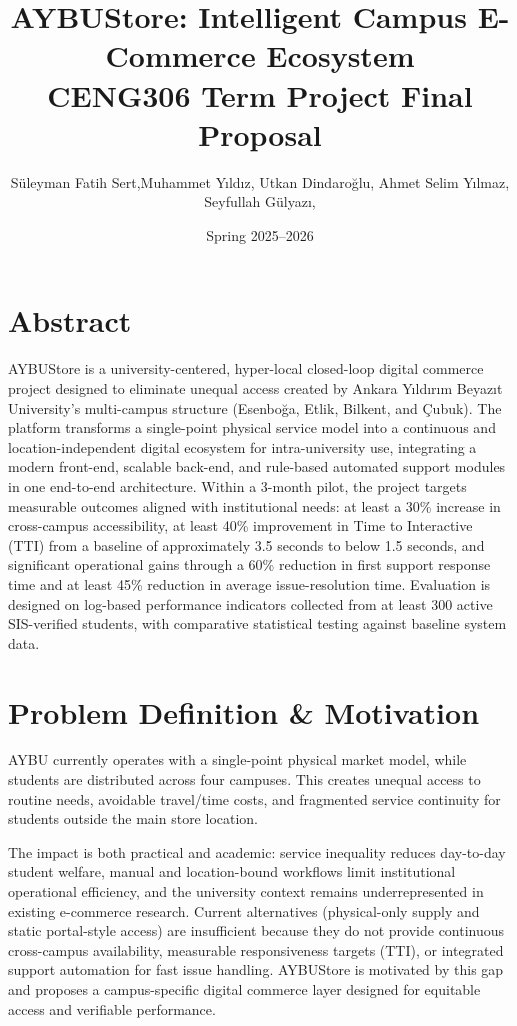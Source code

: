 \documentclass[11pt,a4paper]{article}
\title{\LARGE \textbf{AYBUStore: Intelligent Campus E-Commerce Ecosystem}\\[0.5em] \large \textbf{CENG306 Term Project Final Proposal}}
\author{Süleyman Fatih Sert,Muhammet Yıldız, Utkan Dindaroğlu, Ahmet Selim Yılmaz, \\ Seyfullah Gülyazı, }
\date{Spring 2025--2026}
\begin{document}
\maketitle

\section{Abstract}
AYBUStore is a university-centered, hyper-local closed-loop digital commerce project designed to eliminate unequal access created by Ankara Yıldırım Beyazıt University's multi-campus structure (Esenboğa, Etlik, Bilkent, and Çubuk). The platform transforms a single-point physical service model into a continuous and location-independent digital ecosystem for intra-university use, integrating a modern front-end, scalable back-end, and rule-based automated support modules in one end-to-end architecture. Within a 3-month pilot, the project targets measurable outcomes aligned with institutional needs: at least a 30\% increase in cross-campus accessibility, at least 40\% improvement in Time to Interactive (TTI) from a baseline of approximately 3.5 seconds to below 1.5 seconds, and significant operational gains through a 60\% reduction in first support response time and at least 45\% reduction in average issue-resolution time. Evaluation is designed on log-based performance indicators collected from at least 300 active SIS-verified students, with comparative statistical testing against baseline system data.

\section{Problem Definition \& Motivation}
AYBU currently operates with a single-point physical market model, while students are distributed across four campuses. This creates unequal access to routine needs, avoidable travel/time costs, and fragmented service continuity for students outside the main store location.

The impact is both practical and academic: service inequality reduces day-to-day student welfare, manual and location-bound workflows limit institutional operational efficiency, and the university context remains underrepresented in existing e-commerce research. Current alternatives (physical-only supply and static portal-style access) are insufficient because they do not provide continuous cross-campus availability, measurable responsiveness targets (TTI), or integrated support automation for fast issue handling. AYBUStore is motivated by this gap and proposes a campus-specific digital commerce layer designed for equitable access and verifiable performance.
\end{document}
